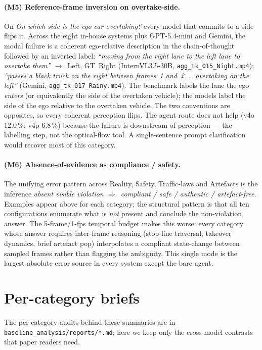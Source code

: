\documentclass[11pt,a4paper]{article}
\newcommand{\pct}[1]{#1\,\%}
\newcommand{\code}[1]{\texttt{#1}}
\begin{document}
\paragraph{(M5) Reference-frame inversion on overtake-side.} On
\emph{On which side is the ego car overtaking?} every model that
commits to a side flips it. Across the eight in-house systems plus
GPT-5.4-mini and Gemini, the modal failure is a coherent ego-relative
description in the chain-of-thought followed by an inverted label:
\emph{``moving from the right lane to the left lane to overtake them''}
$\to$~Left, GT~Right (InternVL3.5-30B,
\code{agg\_tk\_015\_Night.mp4}); \emph{``passes a black truck on the
right between frames~1 and~2 \dots\ overtaking on the left''} (Gemini,
\code{agg\_tk\_017\_Rainy.mp4}). The benchmark labels the lane the
ego \emph{enters} (or equivalently the side of the overtaken vehicle);
the models label the side of the ego relative to the overtaken vehicle.
The two conventions are opposites, so every coherent perception flips.
The agent route does not help (v4o \pct{12.0}; v4p \pct{6.8}) because
the failure is downstream of perception --- the labelling step, not the
optical-flow tool. A single-sentence prompt clarification would
recover most of this category.

\paragraph{(M6) Absence-of-evidence as compliance / safety.} The
unifying error pattern across Reality, Safety, Traffic-laws and
Artefacts is the inference \emph{absent visible violation
$\Rightarrow$~compliant / safe / authentic / artefact-free}. Examples
appear above for each category; the structural pattern is that all
ten configurations enumerate what is \emph{not} present and conclude
the non-violation answer. The 5-frame/1-fps temporal budget makes this
worse: every category whose answer requires inter-frame reasoning
(stop-line traversal, takeover dynamics, brief artefact pop) interpolates
a compliant state-change between sampled frames rather than flagging
the ambiguity. This single mode is the largest absolute error source in
every system except the bare agent.

\section{Per-category briefs}
\label{sec:briefs}

The per-category audits behind these summaries are in
\code{baseline\_analysis/reports/*.md}; here we keep only the
cross-model contrasts that paper readers need.
\end{document}
